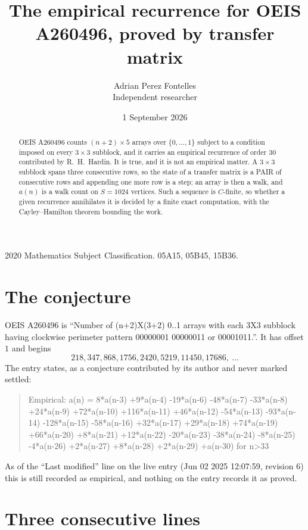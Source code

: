 \documentclass[11pt,a4paper]{article}
\title{The empirical recurrence for OEIS A260496, proved by transfer matrix}
\author{Adrian Perez Fontelles\\ \small Independent researcher}
\date{1 September 2026}
\theoremstyle{plain}
\theoremstyle{definition}
\begin{document}
\maketitle

\begin{abstract}
OEIS A260496 counts $(n+2)\times5$ arrays over $\{0,\dots,1\}$ subject to a condition imposed on
every $3\times3$ subblock, and it carries an empirical recurrence of order $30$
contributed by R.~H.~Hardin. It is true, and it is not an empirical matter. A $3\times3$
subblock spans three consecutive rows, so the state of a transfer matrix is a PAIR of
consecutive rows and appending one more row is a step; an array is then a walk, and
$a(n)$ is a walk count on $S=1024$ vertices. Such a sequence is $C$-finite, so whether a given
recurrence annihilates it is decided by a finite exact computation, with the Cayley--Hamilton
theorem bounding the work.
\end{abstract}

\noindent\small 2020 Mathematics Subject Classification. 05A15, 05B45, 15B36.\normalsize

\section{The conjecture}

OEIS A260496 is ``Number of (n+2)X(3+2) 0..1 arrays with each 3X3 subblock having clockwise perimeter pattern 00000001 00000011 or 00001011.''. It has offset $1$ and begins
\[
218, 347, 868, 1756, 2420, 5219, 11450, 17686,\ \dots
\]
The entry states, as a conjecture contributed by its author and never marked settled:
\begin{quote}
Empirical: a(n) = 8*a(n-3) +9*a(n-4) -19*a(n-6) -48*a(n-7) -33*a(n-8) +24*a(n-9) +72*a(n-10) +116*a(n-11) +46*a(n-12) -54*a(n-13) -93*a(n-14) -128*a(n-15) -58*a(n-16) +32*a(n-17) +29*a(n-18) +74*a(n-19) +66*a(n-20) +8*a(n-21) +12*a(n-22) -20*a(n-23) -38*a(n-24) -8*a(n-25) -4*a(n-26) +2*a(n-27) +8*a(n-28) +2*a(n-29) +a(n-30) for n>33
\end{quote}
As of the ``Last modified'' line on the live entry (Jun 02 2025 12:07:59, revision 6) this is still
recorded as empirical, and nothing on the entry records it as proved.

\section{Three consecutive lines}
\end{document}

